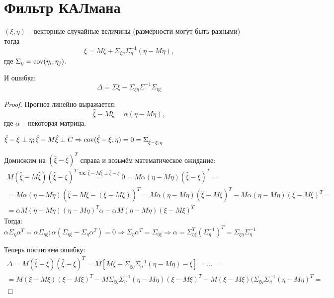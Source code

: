 \section{Фильтр КАЛмана}

\begin{theorem}
  $(\xi, \eta)$ -- векторные случайные величины (размерности могут быть разными) тогда 
  \[
    \hat{\xi} = M\xi + \Sigma_{\xi\eta} \Sigma^{-1}_{\eta} (\eta - M\eta),
  \]
  где $\Sigma_\eta = \operatorname{cov} (\eta_i, \eta_j)$.

  И ошибка:
  \[
    \Delta = \Sigma \xi - \Sigma_{\xi\eta} \Sigma^{-1} \Sigma_{\eta \xi}
  \]
\end{theorem}
\begin{proof}
  Прогноз линейно выражается:
  \[
    \hat{\xi} - M\xi = \alpha (\eta - M\eta),
  \]
  где $\alpha$ -- некоторая матрица.

  $\hat{\xi} - \xi \perp \eta; \hat{\xi} - M\hat{\xi} \perp C \Rightarrow \operatorname{cov}(\hat{\xi}-\xi, \eta) = 0 = \Sigma_{\hat{\xi}-\xi, \eta}$

  Домножим на $(\hat{\xi}-\xi)^T$ справа и возьмём математическое ожидание:
  \begin{multline*}
    M(\hat{\xi}-M\hat{\xi})(\hat{\xi}-\xi)^T \overset{\text{т.к. $\hat{\xi} - M\hat{\xi} \perp \hat{\xi} - \xi$}}{=} 0 = M\alpha (\eta-M\eta)(\hat{\xi}-\xi)^T = \\
    = M\alpha(\eta-M\eta)(\hat{\xi} - M\xi - (\xi-M\xi))^T = 
    M\alpha(\eta - M\eta)(\hat{\xi} - M\xi)^T - M\alpha(\eta-M\eta)(\xi - M\xi)^T = \\
    = \alpha M(\eta-M\eta)(\eta-M\eta)^T\alpha - \alpha M(\eta-M\eta)(\xi-M\xi)^T
  \end{multline*}
  Тогда:
  \[
    \alpha \Sigma_\eta \alpha^T = \alpha \Sigma_{\eta\xi}; \alpha(\Sigma_{\eta\xi} - \Sigma_{\eta} \alpha^T) = 0 \Rightarrow \Sigma_\eta \alpha^T = \Sigma_{\eta\xi} \Rightarrow \alpha = \Sigma_{\eta\xi}^T (\Sigma_{\eta}^{-1})^T = \Sigma_{\xi\eta} \Sigma_{\eta}^{-1}
  \]

  Теперь посчитаем ошибку:
  \begin{multline*}
    \Delta = M(\hat{\xi}-\xi)(\hat{\xi}-\xi)^T = M \left[ M\xi - \Sigma_{\xi\eta}\Sigma_{\eta}^{-1} (\eta-M\eta) - \xi \right] = \dots = \\
    = M(\xi-M\xi)(\xi-M\xi)^T - M\Sigma_{\xi\eta} \Sigma_{\eta}^{-1} (\eta-M\eta)(\xi-M\xi)^T - M(\xi-M\xi)(\Sigma_{\xi\eta} \Sigma_{\eta}^{-1} (\eta-M\eta)^T =
  \end{multline*}
\end{proof}

